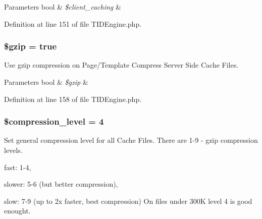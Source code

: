 \begin{DoxyParams}[1]{Parameters}
bool & {\em \$client\_\-caching} & \\
\hline
\end{DoxyParams}


Definition at line 151 of file TIDEngine.php.

\hypertarget{group__general__cache__settings_ga5ac8836bca7856f49bf02d7d95c2edd2}{
\subsubsection[{\$gzip}]{\setlength{\rightskip}{0pt plus 5cm}\$gzip = true}}
\label{group__general__cache__settings_ga5ac8836bca7856f49bf02d7d95c2edd2}
Use gzip compression on Page/Template Compress Server Side Cache Files.


\begin{DoxyParams}[1]{Parameters}
bool & {\em \$gzip} & \\
\hline
\end{DoxyParams}


Definition at line 158 of file TIDEngine.php.

\hypertarget{group__general__cache__settings_ga9a4e30766e452f0d2feaecd666787ca1}{
\subsubsection[{\$compression\_\-level}]{\setlength{\rightskip}{0pt plus 5cm}\$compression\_\-level = 4}}
\label{group__general__cache__settings_ga9a4e30766e452f0d2feaecd666787ca1}
Set general compression level for all Cache Files. There are 1-\/9 -\/ gzip compression levels.
\begin{DoxyItemize}
\item fast: 1-\/4,
\item slower: 5-\/6 (but better compression),
\item slow: 7-\/9 (up to 2x faster, best compression) On files under 300K level 4 is good enought.
\end{DoxyItemize}


